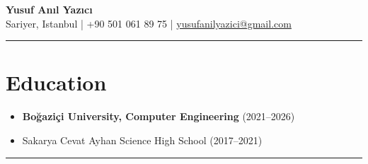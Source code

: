 \documentclass{article}
\begin{document}
\begin{center}
    {\Large \textbf{Yusuf Anıl Yazıcı}}\\[0.5em]
    Sariyer, Istanbul \quad | \quad +90 501 061 89 75 \quad | \quad
    \href{mailto:yusufanilyazici@gmail.com}{yusufanilyazici@gmail.com}
\end{center}
\vspace{0.5em}
\hrule
\vspace{0.3em}
\section*{Education}
\vspace{-0.3em}
\begin{itemize}
    \item \textbf{Boğaziçi University, Computer Engineering} (2021--2026)
    \item Sakarya Cevat Ayhan Science High School (2017--2021)
\end{itemize}
\hrule
\vspace{0.3em}
\end{document}

